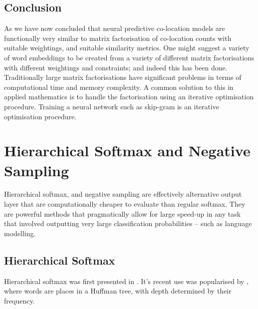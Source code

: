 \documentclass[parskip]{komatufte}
\begin{document}
\subsection{Conclusion}
As we have now concluded that neural predictive co-location models are functionally very similar to matrix factorisation of co-location counts with suitable weightings, and suitable similarity metrics.
One might suggest a variety of word embeddings to be created from a variety of different matrix factorisations with different weightings and constraints; and indeed this has been done.
Traditionally large matrix factorisations have significant problems in terms of computational time and memory complexity.
A common solution to this in applied mathematics is to handle the factorisation using an iterative optimisation procedure.
Training a neural network such as skip-gram is an iterative optimisation procedure.




\section{Hierarchical Softmax and Negative Sampling}\label{sec:hierachical-softmax-and-negative-sampling}

Hierarchical softmax, and negative sampling are effectively alternative output layer that are computationally cheaper to evaluate than regular softmax.
They are powerful methods that pragmatically allow for large speed-up in any task that involved outputting very large classification probabilities -- such as language modelling.


\subsection{Hierarchical Softmax}
Hierarchical softmax was first presented in  .
It's recent use was popularised by , where words are places in a Huffman tree, with depth determined by their frequency.


\end{document}
